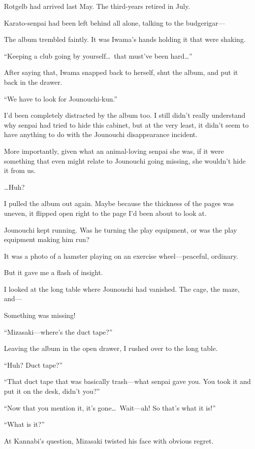 \documentclass[
    a4paper,
    12pt,
    twoside,
    openany,
    UTF8,
    fontset=windows
]{ctexbook}
\begin{document}
Rotgelb had arrived last May. The third-years retired in July.

Karato-senpai had been left behind all alone, talking to the budgerigar---

The album trembled faintly. It was Iwama's hands holding it that were shaking.

``Keeping a club going by yourself\dots\ that must've been hard\dots''

After saying that, Iwama snapped back to herself, shut the album, and put it back in the drawer.

``We have to look for Jounouchi-kun.''

I'd been completely distracted by the album too. I still didn't really understand why senpai had tried to hide this cabinet, but at the very least, it didn't seem to have anything to do with the Jounouchi disappearance incident.

More importantly, given what an animal-loving senpai she was, if it were something that even might relate to Jounouchi going missing, she wouldn't hide it from us.

\dots Huh?

I pulled the album out again. Maybe because the thickness of the pages was uneven, it flipped open right to the page I'd been about to look at.

Jounouchi kept running. Was he turning the play equipment, or was the play equipment making him run?

It was a photo of a hamster playing on an exercise wheel---peaceful, ordinary.

But it gave me a flash of insight.

I looked at the long table where Jounouchi had vanished. The cage, the maze, and---

Something was missing!

``Mizasaki---where's the duct tape?''

Leaving the album in the open drawer, I rushed over to the long table.

``Huh? Duct tape?''

``That duct tape that was basically trash---what senpai gave you. You took it and put it on the desk, didn't you?''

``Now that you mention it, it's gone\dots\ Wait---ah! So that's what it is!''

``What is it?''

At Kannabi's question, Mizasaki twisted his face with obvious regret.
\end{document}

